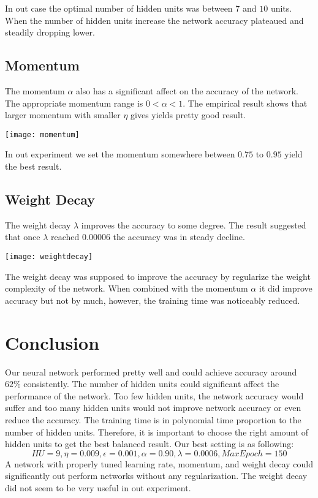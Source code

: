 \documentclass{article}
\begin{document}
In out case the optimal number of hidden units was between $7$ and $10$ units. When the number of hidden units increase the network accuracy plateaued and steadily dropping lower.

\subsection{Momentum}
The momentum $\alpha$ also has a significant affect on the accuracy of the network. The appropriate momentum range is $0<\alpha<1$. The empirical result shows that larger momentum with smaller $\eta$ gives yields pretty good result.

\begin{center}
 \texttt{[image: momentum]}
\end{center}

In out experiment we set the momentum somewhere between $0.75$ to $0.95$ yield the best result.

\subsection{Weight Decay}
The weight decay $\lambda$ improves the accuracy to some degree. The result suggested that once $\lambda$ reached $0.00006$ the accuracy was in steady decline.

\begin{center}
 \texttt{[image: weightdecay]}
\end{center}


The weight decay was supposed to improve the accuracy by regularize the weight complexity of the network. When combined with the momentum $\alpha$ it did improve accuracy but not by much, however, the training time was noticeably reduced.

\section{Conclusion}
Our neural network performed pretty well and could achieve accuracy around $62\%$ consistently. The number of hidden units could significant affect the performance of the network. Too few hidden units, the network accuracy would suffer and too many hidden units would not improve network accuracy or even reduce the accuracy. The training time is in polynomial time proportion to the number of hidden units. Therefore, it is important to choose the right amount of hidden units to get the best balanced result. Our best setting is as following:
\begin{equation*}
HU=9, \eta=0.009, \epsilon=0.001, \alpha=0.90, \lambda=0.0006,  MaxEpoch=150
\end{equation*}
A network with properly tuned learning rate, momentum, and weight decay could significantly out perform networks without any regularization. The weight decay did not seem to be very useful in out experiment.
\end{document}
